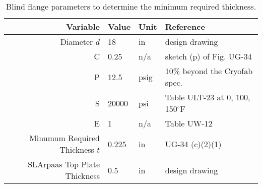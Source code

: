 \begin{table}[h]
\begin{center}
\tabcolsep=10pt
\begin{tabular}{r|l|l|l}
\hline
\hline
Variable & Value & Unit & Reference \\
\hline
Diameter $d$ & 18 & in & design drawing \\
C & 0.25 & n/a & sketch (p) of Fig. UG-34 \\
P & 12.5 & psig & 10\% beyond the Cryofab spec. \\
S & 20000 & psi & Table ULT-23 at 0, 100, 150$^{\circ}$F \\
E & 1 & n/a & Table UW-12 \\
\hline
Minumum Required Thickness $t$ & 0.225 & in & UG-34 (c)(2)(1) \\
\hline
SLArpaas Top Plate Thickness & 0.5 & in & design drawing \\
\hline
\hline
\end{tabular}
\caption{Blind flange parameters to determine the minimum required thickness.}
\label{table:blind_flange}
\end{center}
\end{table}
